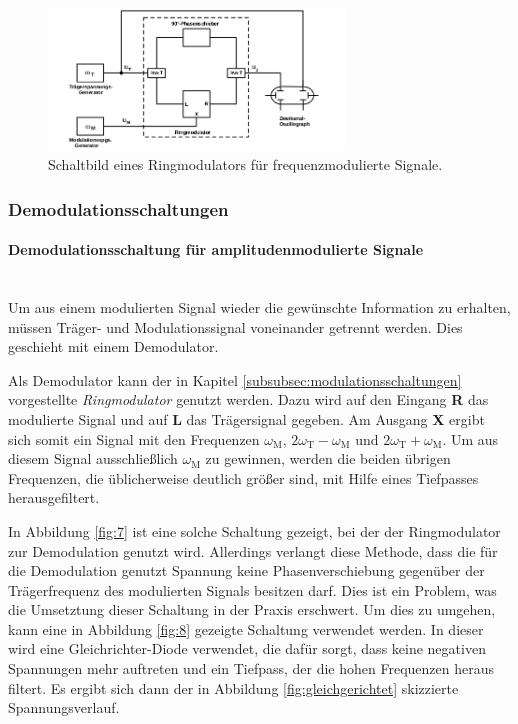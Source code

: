 \begin{figure}
\centering
\includegraphics[width=0.7\textwidth]{figures/frequenzmodulator.PNG}
\caption{Schaltbild eines Ringmodulators für frequenzmodulierte Signale.\cite{sample}}
\label{fig:6}
\end{figure}

\FloatBarrier

\subsubsection{Demodulationsschaltungen}
\label{subsubsec:demodulationschaltungen}
\paragraph{Demodulationsschaltung für amplitudenmodulierte Signale}
\mbox{}\\
Um aus einem modulierten Signal wieder die gewünschte Information zu erhalten,
müssen Träger- und Modulationssignal voneinander getrennt werden.
Dies geschieht mit einem Demodulator.

Als Demodulator kann der in Kapitel \ref{subsubsec:modulationsschaltungen}
vorgestellte \textit{Ringmodulator} genutzt werden.
Dazu wird auf den Eingang \textbf{R} das modulierte Signal und
auf \textbf{L} das Trägersignal gegeben.
Am Ausgang \textbf{X} ergibt sich somit
ein Signal mit den Frequenzen
$\omega_{\text{M}}$, $2\omega_{\text{T}} - \omega_{\text{M}}$
und $2\omega_{\text{T}} + \omega_{\text{M}}$.
Um aus diesem Signal ausschließlich $\omega_{\text{M}}$ zu gewinnen,
werden die beiden übrigen Frequenzen, die üblicherweise deutlich größer sind,
mit Hilfe eines Tiefpasses herausgefiltert.

In Abbildung \ref{fig:7} ist eine solche Schaltung gezeigt,
bei der der Ringmodulator zur Demodulation genutzt wird. Allerdings
verlangt diese Methode, dass die für die Demodulation genutzt
Spannung keine Phasenverschiebung gegenüber der Trägerfrequenz des
modulierten Signals besitzen darf. Dies ist ein Problem, was die Umsetztung dieser
Schaltung in
der Praxis erschwert.
Um dies zu umgehen, kann eine in Abbildung \ref{fig:8} gezeigte
Schaltung verwendet werden. In dieser wird eine Gleichrichter-Diode verwendet,
die dafür sorgt, dass keine negativen Spannungen mehr auftreten und
ein Tiefpass, der die hohen Frequenzen heraus filtert.
Es ergibt sich dann der in Abbildung \ref{fig:gleichgerichtet}
skizzierte Spannungsverlauf.




